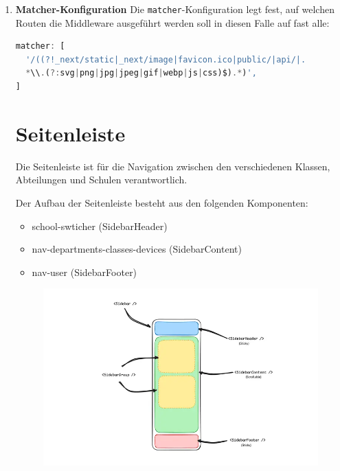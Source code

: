 \begin{inhalt}
\begin{enumerate}[label=\textbf{\arabic*.}]
\begin{lstlisting}[style=mytsx]
  \end{lstlisting}

  \item \textbf{Matcher-Konfiguration}
  Die \texttt{matcher}-Konfiguration legt fest, auf welchen Routen die Middleware ausgeführt werden soll in diesen Falle auf fast alle:

\begin{lstlisting}[language=TypeScript]
matcher: [
  '/((?!_next/static|_next/image|favicon.ico|public/|api/|.
  *\\.(?:svg|png|jpg|jpeg|gif|webp|js|css)$).*)',
]


\end{lstlisting}



\clearpage

\newpage

\section{Seitenleiste}

Die Seitenleiste ist für die Navigation zwischen den verschiedenen Klassen, Abteilungen und Schulen verantwortlich.  

Der Aufbau der Seitenleiste besteht aus den folgenden Komponenten:

\begin{itemize}
    \item school-swticher (SidebarHeader)
    \item nav-departments-classes-devices (SidebarContent)
    \item nav-user (SidebarFooter)
\end{itemize}


\vspace{2cm}

\begin{figure}[!htb]
\centering
\includegraphics[width=1\textwidth]{files/Thomas/pics/Website/Sidebar/sidebar-aufbau.png}
\caption[Bildbezeichnung für Abbildungsverzeichnis]{}
\label{fig:gehaeuse_internet_bild}
\end{figure}


\end{enumerate}
\end{inhalt}
